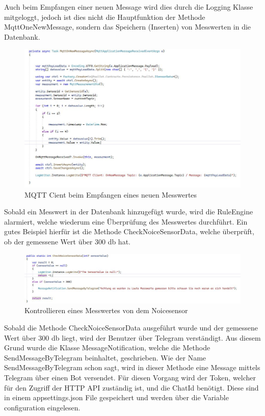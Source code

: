 Auch beim Empfangen einer neuen Message wird dies durch die Logging Klasse mitgeloggt,
 jedoch ist dies nicht die Hauptfunktion der Methode MqttOneNewMessage, sondern 
 das Speichern (Inserten) von Messwerten in die Datenbank.

 \begin{figure}[H]
    \centering
    \includegraphics[width=1.1\textwidth]{pics/StartMqttClientMqttOnNewMessageAsync.JPG}  
    \caption{MQTT Cient beim Empfangen eines neuen Messwertes}
\end{figure}

Sobald ein Messwert in der Datenbank hinzugefügt wurde, wird die RuleEngine alarmiert,
welche wiederum eine Überprüfung des Messwertes durchführt. Ein gutes Beispiel hierfür ist die
Methode CheckNoiceSensorData, welche überprüft, ob der gemessene Wert über 300 db hat.

\begin{figure}[H]
    \centering
    \includegraphics[width=1.1\textwidth]{pics/CheckNoiceData.JPG}  
    \caption{Kontrollieren eines Messwertes von dem Noicesensor}
\end{figure}

Sobald die Methode CheckNoiceSensorData ausgeführt wurde und der gemessene Wert über 300 db liegt,
wird der Benutzer über Telegram verständigt. Aus diesem Grund wurde die Klasse MessageNotification, 
welche die Methode SendMessageByTelegram beinhaltet, geschrieben. Wie der Name SendMessageByTelegram
schon sagt, wird in dieser Methode eine Message mittels Telegram über einen Bot versendet.
Für diesen Vorgang wird der Token, welcher für den Zugriff der HTTP API zuständig ist, und die ChatId benötigt.
Diese sind in einem appsettings.json File gespeichert und werden über die Variable configuration eingelesen.

